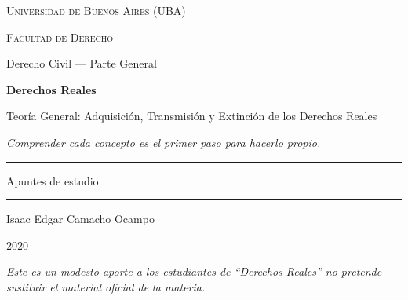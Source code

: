 \documentclass[12pt,oneside]{book}
\newcommand{\universidad}{Universidad de Buenos Aires (UBA)}
\newcommand{\facultad}{Facultad de Derecho}
\newcommand{\carrera}{Derecho Civil --- Parte General}
\newcommand{\materia}{Derechos Reales}
\newcommand{\titulo}{Teoría General: Adquisición, Transmisión y Extinción de los Derechos Reales}
\newcommand{\autor}{Isaac Edgar Camacho Ocampo}
\newcommand{\anio}{2020}
\begin{document}
\begin{titlepage}

\thispagestyle{empty}

\begin{center}

\vspace*{1cm}

{\large \textsc{\universidad}}

\vspace{0.2cm}

{\large \textsc{\facultad}}

\vspace{0.2cm}

{\large \carrera}

\vspace{3cm}

{\Huge \textbf{\materia}}

\vspace{1cm}

{\LARGE \titulo}

\vspace{0.8cm}

\textit{Comprender cada concepto es el primer paso para hacerlo propio.}

\vspace{1.2cm}

\rule{0.70\textwidth}{0.5pt}

\vspace{0.5cm}

{\large Apuntes de estudio}

\vspace{0.5cm}

\rule{0.70\textwidth}{0.5pt}

\vfill

{\large \autor}

\vspace{0.3cm}

{\large \anio}

\end{center}

\vfill

\begin{flushleft}
\textit{Este es un modesto aporte a los estudiantes de ``Derechos Reales'' no pretende sustituir el material oficial de la materia.}
\end{flushleft}

\end{titlepage}
\end{document}

